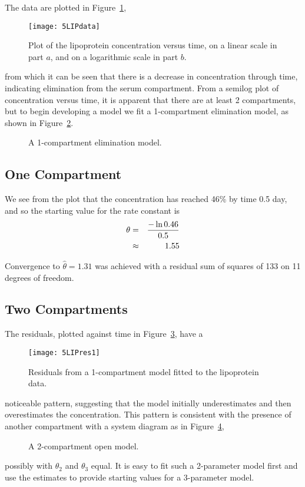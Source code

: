 The data are plotted in Figure~\ref{fig:LIPdata},
\begin{figure}
  \centerline{\texttt{[image: 5LIPdata]}}%
  \caption{\label{fig:LIPdata}
  Plot of the lipoprotein concentration versus time, on a linear scale
  in part $a$, and on a logarithmic scale in part $b$.
  }
\end{figure}
from which it can be seen that
there is a decrease in concentration through time, indicating
elimination from the serum compartment.
From a semilog plot of concentration versus time, it is apparent
that there are at least 2 compartments, but
to begin developing a model we fit a 1-compartment
elimination model, as shown in Figure~\ref{fig:1compart}.

\begin{figure}
  \centerline{\box\graph}
  \caption{\label{fig:1compart}
  A 1-compartment elimination model.
  }
\end{figure}

\subsection{One Compartment}

We see from the plot that the concentration has reached
46\% by time 0.5 day, and so the starting value for the
rate constant is
\begin{eqnarray*}
  \theta&=&{- \ln0.46 \over 0.5 }\\
  &\approx&1.55
\end{eqnarray*}

Convergence to $ \hat \theta = 1.31$ was achieved
with a residual sum of squares of 133 on 11 degrees of freedom.

\subsection{Two Compartments}

The residuals, plotted against time in Figure~\ref{fig:LIPres1}, have a
\begin{figure}
  \centerline{\texttt{[image: 5LIPres1]}}%
  \caption{\label{fig:LIPres1}
  Residuals from a 1-compartment model fitted to the lipoprotein data.
  }
\end{figure}
noticeable pattern, suggesting that the model initially
underestimates and then overestimates the concentration.
This pattern is consistent with the presence of
another compartment with a system diagram as in
Figure~\ref{fig:twocomp},

\begin{figure}
  \centerline{\box\graph}
  \caption{\label{fig:twocomp}
  A 2-compartment open model.
  }
\end{figure}
possibly with $\theta_{2}$ and $\theta_{3}$ equal.
It is easy to fit such a 2-parameter model first and use the
estimates to provide starting values for a 3-parameter model.

